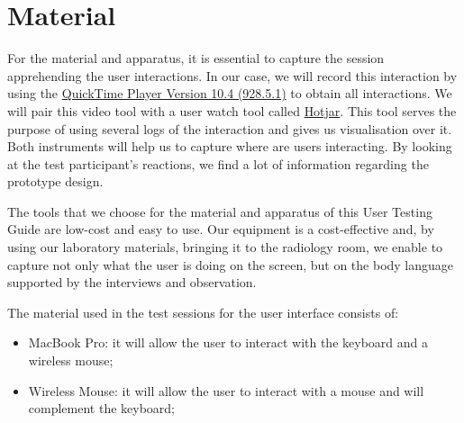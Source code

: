 
\section{Material}
\label{sec:sec005}

For the material and apparatus, it is essential to capture the session apprehending the user interactions. In our case, we will record this interaction by using the \hyperlink{https://support.apple.com/quicktime}{QuickTime Player Version 10.4 (928.5.1)} to obtain all interactions. We will pair this video tool with a user watch tool called \hyperlink{https://www.hotjar.com/}{Hotjar}. This tool serves the purpose of using several logs of the interaction and gives us visualisation over it. Both instruments will help us to capture where are users interacting. By looking at the test participant's reactions, we find a lot of information regarding the prototype design.

\clearpage

The tools that we choose for the material and apparatus of this User Testing Guide are low-cost and easy to use. Our equipment is a cost-effective and, by using our laboratory materials, bringing it to the radiology room, we enable to capture not only what the user is doing on the screen, but on the body language supported by the interviews and observation.

\hfill

The material used in the test sessions for the user interface consists of:

\hfill

\begin{itemize}
  \item MacBook Pro: it will allow the user to interact with the keyboard and a wireless mouse;
  \item Wireless Mouse: it will allow the user to interact with a mouse and will complement the keyboard;
\end{itemize}

\hfill



